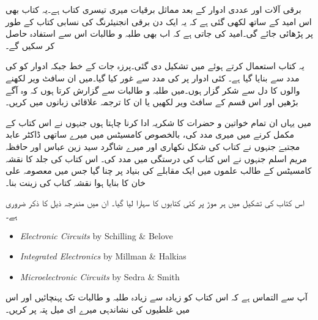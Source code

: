 \thispagestyle{empty}
برقی آلات اور عددی ادوار کے بعد مماثل برقیات میری تیسری کتاب ہے۔یہ کتاب بھی اس امید کے ساتھ لکھی گئی ہے کہ یہ ایک دن برقی انجنیئرنگ کی نسابی کتاب کے طور پر پڑھائی جائے گی۔امید کی جاتی ہے کہ اب بھی طلبہ و طالبات اس سے استفادہ حاصل کر سکیں گے۔

یہ کتاب  استعمال  کرتے ہوئے  میں تشکیل دی گئی۔پرزہ جات کے خط  جبکہ ادوار کو  کی مدد سے بنایا گیا ہے۔ کئی ادوار پر  کی مدد سے غور کیا گیا۔میں ان سافٹ ویر لکھنے والوں کا دل سے شکر گزار ہوں۔میں طلبہ و طالبات سے گزارش  کرتا ہوں کہ وہ آگے بڑھیں اور اس قسم کے سافٹ ویر لکھیں یا ان کا ترجمہ علاقائی زبانوں میں کریں۔

میں یہاں ان تمام خواتین و حضرات کا شکریہ ادا کرنا چاہتا ہوں جنہوں نے اس کتاب کے مکمل کرنے میں میری مدد کی، بالخصوص کامسیٹس میں میرے ساتھی ڈاکٹر عابد مجتبےٰ جنہوں نے کتاب کی شکل نکھاری اور میرے شاگرد سید زین عباس اور حافظہ مریم اسلم جنہوں نے اس کتاب کی درستگی میں مدد کی۔ اس کتاب کی جلد کا نقشہ کامسیٹس کے طالب علموں میں ایک مقابلے کی بنیاد پر چنا گیا جس میں معصومہ علی خان کا بنایا ہوا نقشہ کتاب کی زینت بنا۔

اس کتاب کی تشکیل میں ہر موڑ پر کئی کتابوں کا سہارا لیا گیا۔ ان میں مندرجہ ذیل کا ذکر ضروری ہے۔

\begin{english}
   \begin{itemize}
      \setlength\itemsep{-1em}
      \item {\textit{Electronic Circuits} by Schilling \& Belove}
      \item {\textit{Integrated Electronics} by Millman \& Halkias}
      \item {\textit{Microelectronic Circuits} by Sedra \& Smith}
   \end{itemize}
\end{english}

آپ سے التماس ہے کہ اس کتاب کو زیادہ سے زیادہ طلبہ و طالبات تک پہنچائیں اور اس میں غلطیوں کی نشاندہی میرے ای میل پتہ پر کریں۔
\vspace{5mm}

{}

